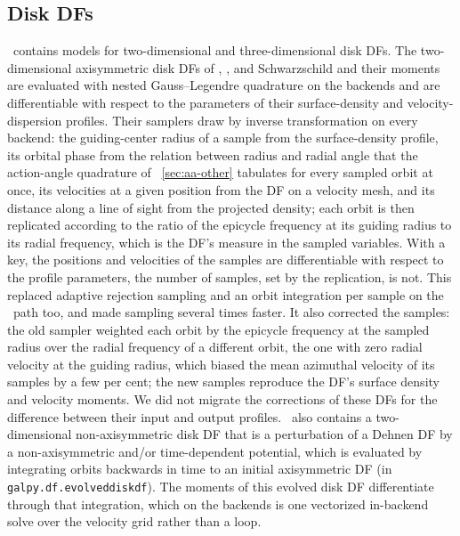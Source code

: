 \subsection{Disk DFs}\label{sec:df-disk}

\galpy\ contains models for two-dimensional and three-dimensional disk DFs.
The two-dimensional axisymmetric disk DFs of \citet{Dehnen1999},
\citet{Shu1969}, and Schwarzschild
and their moments are evaluated with nested Gauss--Legendre quadrature
on the backends and are differentiable with respect to the parameters of
their surface-density and velocity-dispersion profiles. Their samplers
draw by inverse transformation on every backend: the guiding-center
radius of a sample from the surface-density profile, its orbital phase
from the relation between radius and radial angle that the action-angle
quadrature of \sectionname~\ref{sec:aa-other} tabulates for every
sampled orbit at once, its velocities at a given position from the DF on
a velocity mesh, and its distance along a line of sight from the
projected density; each orbit is then replicated according to the ratio
of the epicycle frequency at its guiding radius to its radial frequency,
which is the DF's measure in the sampled variables. With a key, the
positions and velocities of the samples are differentiable with respect
to the profile parameters, the number of samples, set by the
replication, is not. This replaced adaptive rejection sampling and an
orbit integration per sample on the \numpy\ path too, and made sampling
several times faster. It also corrected the samples: the old sampler
weighted each orbit by the epicycle frequency at the sampled radius over
the radial frequency of a different orbit, the one with zero radial
velocity at the guiding radius, which biased the mean azimuthal velocity
of its samples by a few per cent; the new samples reproduce the DF's
surface density and velocity moments.
We did not migrate
the corrections of these DFs for the difference between their input and
output profiles. \galpy\ also contains
a two-dimensional non-axisymmetric disk DF that is a perturbation of a Dehnen DF by a
non-axisymmetric and/or time-dependent potential, which is evaluated by integrating orbits
backwards in time to an initial axisymmetric DF (in \texttt{galpy.df.evolveddiskdf}). 
The moments of
this evolved disk DF differentiate through that integration,
which on the backends is one vectorized in-backend solve over the
velocity grid rather than a loop. 

